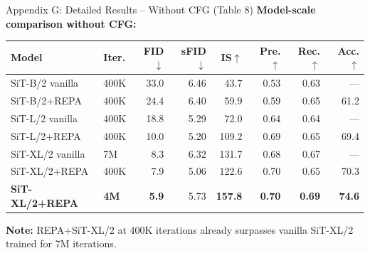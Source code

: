 \documentclass[aspectratio=169, 10pt]{beamer}
\begin{document}
\begin{frame}{Appendix G: Detailed Results -- Without CFG (Table 8)}
\small
\textbf{Model-scale comparison without CFG:}

\vspace{0.3em}
\begin{center}
\begin{tabular}{llrrrrrr}
\toprule
\textbf{Model} & \textbf{Iter.} & \textbf{FID$\downarrow$} & \textbf{sFID$\downarrow$} & \textbf{IS$\uparrow$} & \textbf{Pre.$\uparrow$} & \textbf{Rec.$\uparrow$} & \textbf{Acc.$\uparrow$} \\
\midrule
SiT-B/2 vanilla    & 400K & 33.0 & 6.46 &  43.7 & 0.53 & 0.63 & --- \\
SiT-B/2+REPA       & 400K & 24.4 & 6.40 &  59.9 & 0.59 & 0.65 & 61.2 \\
\midrule
SiT-L/2 vanilla    & 400K & 18.8 & 5.29 &  72.0 & 0.64 & 0.64 & --- \\
SiT-L/2+REPA       & 400K & 10.0 & 5.20 & 109.2 & 0.69 & 0.65 & 69.4 \\
\midrule
SiT-XL/2 vanilla   &  7M  &  8.3 & 6.32 & 131.7 & 0.68 & 0.67 & --- \\
SiT-XL/2+REPA      & 400K &  7.9 & 5.06 & 122.6 & 0.70 & 0.65 & 70.3 \\
\textbf{SiT-XL/2+REPA} & \textbf{4M} & \textbf{5.9} & 5.73 & \textbf{157.8} & \textbf{0.70} & \textbf{0.69} & \textbf{74.6} \\
\bottomrule
\end{tabular}
\end{center}

\vspace{0.3em}
\textbf{Note:} REPA+SiT-XL/2 at 400K iterations already surpasses vanilla SiT-XL/2 trained for 7M iterations.
\end{frame}
\end{document}
